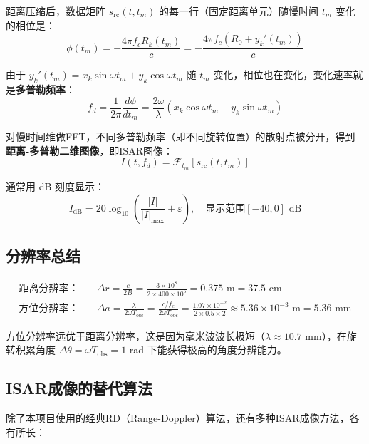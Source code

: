 \documentclass[12pt, a4paper]{article}
\begin{document}
距离压缩后，数据矩阵 $s_\text{rc}(t, t_m)$ 的每一行（固定距离单元）随慢时间 $t_m$ 变化的相位是：
\begin{equation}
\phi(t_m) = -\frac{4\pi f_c R_k(t_m)}{c} = -\frac{4\pi f_c (R_0 + y_k'(t_m))}{c}
\end{equation}

由于 $y_k'(t_m) = x_k\sin\omega t_m + y_k\cos\omega t_m$ 随 $t_m$ 变化，相位也在变化，变化速率就是\textbf{多普勒频率}：
\begin{equation}
f_d = \frac{1}{2\pi}\frac{d\phi}{dt_m} = \frac{2\omega}{\lambda}(x_k\cos\omega t_m - y_k\sin\omega t_m)
\end{equation}

对慢时间维做FFT，不同多普勒频率（即不同旋转位置）的散射点被分开，得到\textbf{距离-多普勒二维图像}，即ISAR图像：
\begin{equation}
I(t, f_d) = \mathcal{F}_{t_m}\!\left[s_\text{rc}(t, t_m)\right]
\end{equation}

通常用 dB 刻度显示：
\begin{equation}
I_\text{dB} = 20\log_{10}\!\left(\frac{|I|}{|I|_\text{max}} + \varepsilon\right), \quad \text{显示范围} [-40, 0] \text{ dB}
\end{equation}

\subsection{分辨率总结}

\begin{align}
\text{距离分辨率：}\quad & \Delta r = \frac{c}{2B} = \frac{3\times10^8}{2\times400\times10^6} = 0.375\text{ m} = 37.5\text{ cm} \\[4pt]
\text{方位分辨率：}\quad & \Delta a = \frac{\lambda}{2\omega T_\text{obs}} = \frac{c/f_c}{2\omega T_\text{obs}} = \frac{1.07\times10^{-2}}{2\times0.5\times2} \approx 5.36\times10^{-3}\text{ m} = 5.36\text{ mm}
\end{align}

方位分辨率远优于距离分辨率，这是因为毫米波波长极短（$\lambda \approx 10.7$ mm），在旋转积累角度 $\Delta\theta = \omega T_\text{obs} = 1$ rad 下能获得极高的角度分辨能力。

\subsection{ISAR成像的替代算法}

除了本项目使用的经典RD（Range-Doppler）算法，还有多种ISAR成像方法，各有所长：
\end{document}
